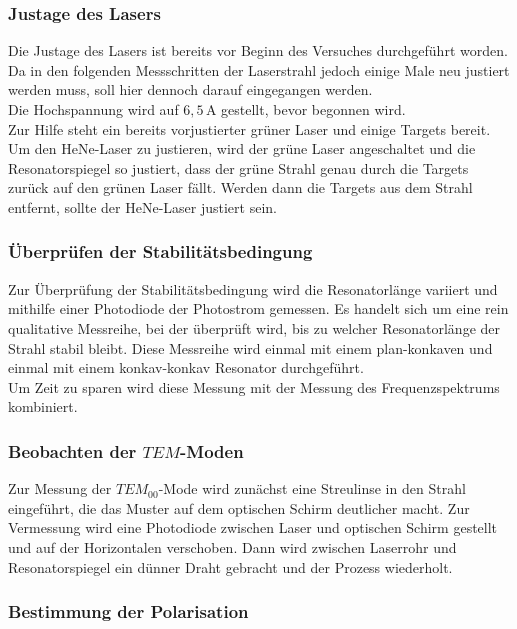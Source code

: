 \subsubsection{Justage des Lasers}

Die Justage des Lasers ist bereits vor Beginn des Versuches durchgeführt worden.
Da in den folgenden Messschritten der Laserstrahl jedoch einige Male neu justiert werden muss, soll hier dennoch darauf eingegangen werden. \\

Die Hochspannung wird auf $6,5 \,\unit{\ampere}$ gestellt, bevor begonnen wird. \\
Zur Hilfe steht ein bereits vorjustierter grüner Laser und einige Targets bereit.
Um den HeNe-Laser zu justieren, wird der grüne Laser angeschaltet und die Resonatorspiegel so justiert, dass der grüne Strahl genau durch die Targets zurück auf den grünen Laser fällt.
Werden dann die Targets aus dem Strahl entfernt, sollte der HeNe-Laser justiert sein.

\subsubsection{Überprüfen der Stabilitätsbedingung}

Zur Überprüfung der Stabilitätsbedingung wird die Resonatorlänge variiert und mithilfe einer Photodiode der Photostrom gemessen. Es handelt sich um eine rein qualitative Messreihe, bei der überprüft wird,
bis zu welcher Resonatorlänge der Strahl stabil bleibt. 
Diese Messreihe wird einmal mit einem plan-konkaven und einmal mit einem konkav-konkav Resonator durchgeführt. \\

Um Zeit zu sparen wird diese Messung mit der Messung des Frequenzspektrums kombiniert.


\subsubsection{Beobachten der $TEM$-Moden}

Zur Messung der $TEM_{00}$-Mode wird zunächst eine Streulinse in den Strahl eingeführt, die das Muster auf dem optischen Schirm deutlicher macht.
Zur Vermessung wird eine Photodiode zwischen Laser und optischen Schirm gestellt und auf der Horizontalen verschoben.
Dann wird zwischen Laserrohr und Resonatorspiegel ein dünner Draht gebracht und der Prozess wiederholt.


\subsubsection{Bestimmung der Polarisation}

